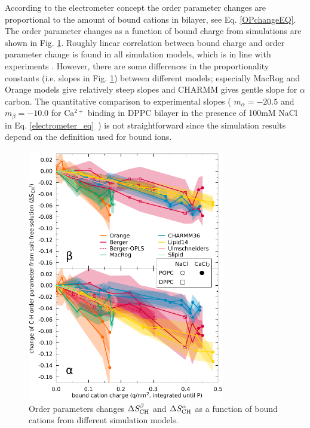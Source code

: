 \documentclass[pre,aps,floatfix,authordate1-4,twocolumn]{revtex4-1}
\begin{document}
According to the electrometer concept the order parameter changes are proportional to
the amount of bound cations in bilayer, see Eq. \ref{OPchangeEQ}.
The order parameter changes as a function of bound charge from simulations are
shown in Fig. \ref{electrometer}. Roughly linear correlation between bound charge
and order parameter change is found in all simulation models, which is in line with
experiments \cite{altenbach84}. However, there are some differences in the 
proportionality constants (i.e. slopes in Fig. \ref{electrometer}) between different
models; especially MacRog and Orange models give relatively steep slopes and CHARMM
gives gentle slope for $\alpha$ carbon. The quantitative comparison to experimental
slopes ( $m_\alpha=-20.5$ and $m_\beta=-10.0$ for Ca$^{2+}$ binding in DPPC bilayer in
the presence of 100mM NaCl in Eq. \ref{electrometer_eq}~\cite{altenbach84}) is not straightforward 
since the simulation results depend on the definition used for bound ions. 
\begin{figure}[]
  \centering
  \includegraphics[width=8.6cm]{../scratch/boundIons/dOP_vs_boundCationCharge_P.pdf}
  \caption{\label{electrometer}
    Order parameters changes $\Delta S_{\rm{CH}}^{\beta}$ and $\Delta S_{\rm{CH}}^{\alpha}$ as a function of bound
    cations from different simulation models.
   }
\end{figure}
\end{document}
